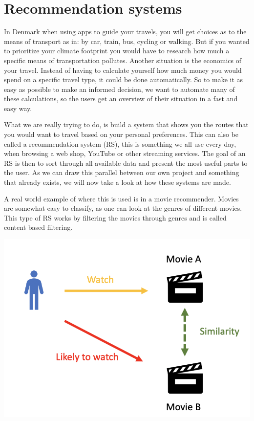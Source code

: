 \section{Recommendation systems}\label{sec:recommendation-systems}

In Denmark when using apps to guide your travels, you will get choices as to the means of transport as in: by car,
train, bus, cycling or walking.
But if you wanted to prioritize your climate footprint you would have to research how much a specific means of
transportation pollutes.
Another situation is the economics of your travel.
Instead of having to calculate yourself how much money you would spend on a specific travel type, it could be done
automatically.
So to make it as easy as possible to make an informed decision, we want to automate many of these calculations, so the
users get an overview of their situation in a fast and easy way.

What we are really trying to do, is build a system that shows you the routes that you would want to travel based on your
personal preferences.
This can also be called a recommendation system (RS), this is something we all use every day, when browsing a web shop,
YouTube or other streaming services.
The goal of an RS is then to sort through all available data and present the most useful parts to the user.
As we can draw this parallel between our own project and something that already exists, we will now take a look at how
these systems are made.

A real world example of where this is used is in a movie recommender.
Movies are somewhat easy to classify, as one can look at the genres of different movies.
This type of RS works by filtering the movies through genres and is called content based filtering.

\includegraphics[width=\textwidth]{images/content-filtering}

